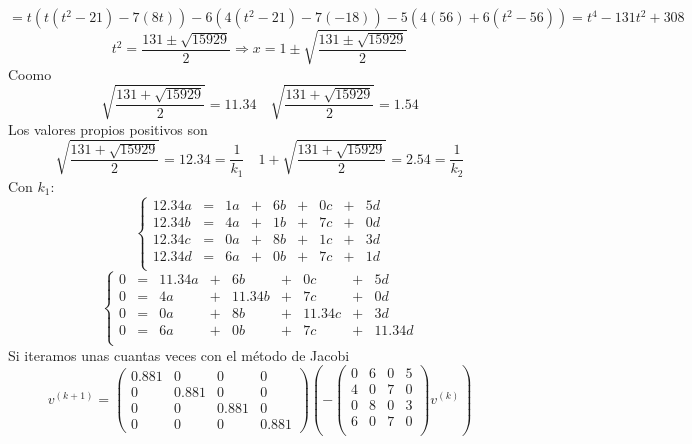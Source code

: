 \documentclass{article}
\begin{document}
$$
= t(
t
(t^2 - 21)
-
7
(8t))
- 6 (
4
(t^2-21)
- 7
(-18)
)
- 5
(
4
(56)
+ 6
(t^2-56)
)=
t^4 - 131 t^2 + 308
$$
$$
t^2 = \frac{131\pm\sqrt{15929}}{2}
\Rightarrow
x = 1 \pm \sqrt{\frac{131\pm\sqrt{15929}}{2}}
$$
Coomo
$$
\sqrt{\frac{131+\sqrt{15929}}{2}} = 11.34 \quad \sqrt{\frac{131+\sqrt{15929}}{2}} = 1.54
$$
Los valores propios positivos son
$$
\sqrt{\frac{131+\sqrt{15929}}{2}} = 12.34 = \frac{1}{k_1} \quad 1+\sqrt{\frac{131+\sqrt{15929}}{2}} = 2.54 = \frac{1}{k_2}
$$
Con $k_1$:
$$
\left\{\begin{array}{ccccccccc}
    12.34a & = & 1a & + & 6b & + & 0c & + & 5d\\
    12.34b & = & 4a & + & 1b & + & 7c & + & 0d\\
    12.34c & = & 0a & + & 8b & + & 1c & + & 3d\\
    12.34d & = & 6a & + & 0b & + & 7c & + & 1d\\
\end{array}\right.
$$
$$
\left\{\begin{array}{ccccccccc}
    0 & = & 11.34a & + & 6b     & + & 0c     & + & 5d    \\
    0 & = & 4a     & + & 11.34b & + & 7c     & + & 0d    \\
    0 & = & 0a     & + & 8b     & + & 11.34c & + & 3d    \\
    0 & = & 6a     & + & 0b     & + & 7c     & + & 11.34d\\
\end{array}\right.
$$
Si iteramos unas cuantas veces con el método de Jacobi
$$
v^{(k+1)} = 
\left(\begin{array}{cccc}
    0.881 & 0 & 0 & 0 \\
    0 & 0.881 & 0 & 0 \\
    0 & 0 & 0.881 & 0 \\
    0 & 0 & 0 & 0.881
\end{array}\right)\left(-
\left(\begin{array}{ccccccccc}
 0 & 6 & 0 & 5\\
 4 & 0 & 7 & 0\\
 0 & 8 & 0 & 3\\
 6 & 0 & 7 & 0\\
\end{array}\right) v^{(k)}\right)
$$
\end{document}
